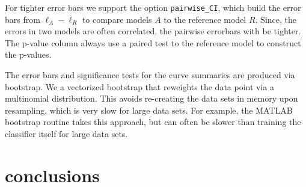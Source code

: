 \documentclass{article}
\newcommand{\code}{\texttt}
\begin{document}
For tighter error bars we support the option \code{pairwise\_CI}, which build the error bars from $\ell_A - \ell_R$ to compare models $A$ to the reference model $R$.
Since, the errors in two models are often correlated, the pairwise errorbars with be tighter.
The p-value column always use a paired test to the reference model to construct the p-values.

The error bars and significance tests for the curve summaries are produced via bootstrap.
We a vectorized bootstrap that reweights the data point via a multinomial distribution.
This avoids re-creating the data sets in memory upon resampling, which is very slow for large data sets.
For example, the MATLAB bootstrap routine takes this approach, but can often be slower than training the classifier itself for large data sets.  %

\section{conclusions}













\end{document}
